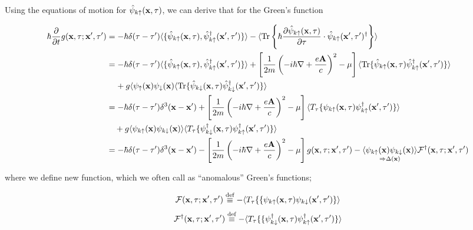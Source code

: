Using the equations of motion for $\hat{\psi}_{k\uparrow}({\bf x},\tau)$, we can derive that for the Green's function

\[\begin{split}
\hbar\frac{\partial }{\partial t}g({\bf x},\tau;{\bf x'},\tau') &= -\hbar\delta(\tau-\tau')\langle\{\hat{\psi}_{k\uparrow}({\bf x},\tau),\hat{\psi}^\dagger_{k\uparrow}({\bf x}',\tau')\}\rangle - \langle \text{Tr}\left\{\hbar\frac{\partial \hat{\psi}_{k\uparrow}({\bf x},\tau)}{\partial \tau}\cdot\hat{\psi}_{k\uparrow}({\bf x}',\tau')^\dagger\right\}\rangle\\
&=-\hbar\delta(\tau-\tau')\langle\{\hat{\psi}_{k\uparrow}({\bf x},\tau),\hat{\psi}^\dagger_{k\uparrow}({\bf x}',\tau')\}\rangle + \left[\frac{1}{2m}\left(-i\hbar\nabla+\frac{e{\bf A}}{c}\right)^2-\mu\right]\langle\text{Tr}\{\hat{\psi}_{k\uparrow}({\bf x},\tau)\hat{\psi}^\dagger_{k\uparrow}({\bf x}',\tau')\}\rangle\\
&\phantom{=\ } + g\langle\psi_\uparrow({\bf x})\psi_{\downarrow}({\bf x})\langle\text{Tr}\{\hat{\psi}_{k\downarrow}({\bf x},\tau)\hat{\psi}^\dagger_{k\downarrow}({\bf x}',\tau')\}\rangle\\
&=-\hbar\delta(\tau-\tau')\delta^3({\bf x-x}') + \left[\frac{1}{2m}\left(-i\hbar\nabla+\frac{e{\bf A}}{c}\right)^2-\mu\right]\langle T_\tau \{\psi_{k\uparrow}({\bf x},\tau)\psi^\dagger_{k\uparrow}({\bf x'},\tau')\}\rangle\\
&\quad + g\langle\psi_{k\uparrow}({\bf x})\psi_{k\downarrow}({\bf x})\rangle\langle T_\tau \{\psi^\dagger_{k\downarrow}({\bf x},\tau)\psi^\dagger_{k\uparrow}({\bf x'},\tau')\}\rangle \\
&=-\hbar\delta(\tau-\tau')\delta^3({\bf x-x'}) - \left[\frac{1}{2m}\left(-i\hbar\nabla+\frac{e{\bf A}}{c}\right)^2-\mu\right]g({\bf x},\tau;{\bf x'},\tau') - \underset{\Rightarrow\Delta({\bf x})}{\langle\psi_{k\uparrow}({\bf x})\psi_{k\downarrow}({\bf x})\rangle}\mathcal{F}^\dagger({\bf x},\tau;{\bf x'},\tau')
\end{split}\]

where we define new function, which we often call as ``anomalous'' Green's functions; 

\[\mathcal{F}({\bf x},\tau;{\bf x'},\tau') \overset{\text{def}}{\equiv}-\langle T_\tau\{\{\psi_{k\uparrow}({\bf x},\tau)\psi_{k\downarrow}({\bf x'},\tau')\}\rangle \]
\[\mathcal{F}^\dagger({\bf x},\tau;{\bf x'},\tau') \overset{\text{def}}{\equiv}-\langle T_\tau\{\{\psi^\dagger_{k\downarrow}({\bf x},\tau)\psi^\dagger_{k\uparrow}({\bf x'},\tau')\}\rangle \]

